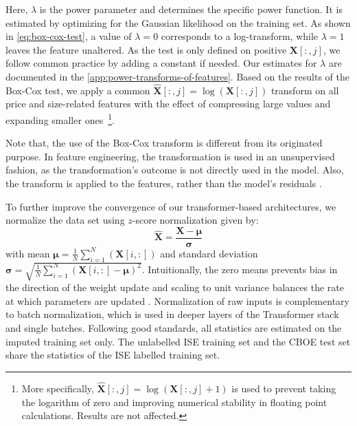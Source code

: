 Here, $\lambda$ is the power parameter and determines the specific power function. It is estimated by optimizing for the Gaussian likelihood on the training set. As shown in \cref{eq:box-cox-test}, a value of $\lambda=0$ corresponds to a log-transform, while $\lambda=1$ leaves the feature unaltered. As the test is only defined on positive $\mathbf{X}\left[:,j\right]$, we follow common practice by adding a constant if needed. Our estimates for $\lambda$ are documented in the \cref{app:power-transforms-of-features}. Based on the results of the Box-Cox test, we apply a common $\widehat{\mathbf{X}}\left[:,j\right]=\log(\mathbf{X}\left[:,j\right])$ transform on all price and size-related features with the effect of compressing large values and expanding smaller ones~\footnote{More specifically, $\widehat{\mathbf{X}}\left[:,j\right]= \log(\mathbf{X}\left[:,j\right]+1)$ is used to prevent taking the logarithm of zero and improving numerical stability in floating point calculations. Results are not affected. }.

Note that, the use of the Box-Cox transform is different from its originated purpose. In feature engineering, the transformation is used in an unsupervised fashion, as the transformation's outcome is not directly used in the model. Also, the transform is applied to the features, rather than the model's residuals \autocite[122]{kuhnFeatureEngineeringSelection2020}.

To further improve the convergence of our transformer-based architectures, we normalize the data set using $z$-score normalization given by:
\begin{equation}
    \widehat{\mathbf{X}}=\frac{\mathbf{X}-\mathbf{\mu}}{\mathbf{\sigma}}
\end{equation}
with mean $\mathbf{\mu} =\frac{1}{N} \sum_{i=1}^N\left(\mathbf{X}\left[i,:\right]\right)$ and standard deviation $\mathbf{\sigma}=\sqrt{\frac{1}{N} \sum_{i=1}^N\left(\mathbf{X}\left[i,:\right]-\mathbf{\mu}\right)^2}$. Intuitionally, the zero means prevents bias in the direction of the weight update and scaling to unit variance balances the rate at which parameters are updated \autocite[][8]{lecunEfficientBackProp2012}. Normalization of raw inputs is complementary to batch normalization, which is used in deeper layers of the Transformer stack and single batches. Following good standards, all statistics are estimated on the imputed training set only. The unlabelled \gls{ISE} training set and the \gls{CBOE} test set share the statistics of the \gls{ISE} labelled training set. 

